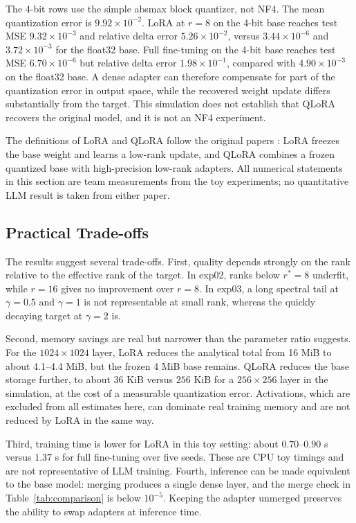 

The 4-bit rows use the simple absmax block quantizer, not NF4. The mean quantization error is $9.92\times10^{-2}$. LoRA at $r=8$ on the 4-bit base reaches test MSE $9.32\times10^{-3}$ and relative delta error $5.26\times10^{-2}$, versus $3.44\times10^{-6}$ and $3.72\times10^{-3}$ for the float32 base. Full fine-tuning on the 4-bit base reaches test MSE $6.70\times10^{-6}$ but relative delta error $1.98\times10^{-1}$, compared with $4.90\times10^{-3}$ on the float32 base. A dense adapter can therefore compensate for part of the quantization error in output space, while the recovered weight update differs substantially from the target. This simulation does not establish that QLoRA recovers the original model, and it is not an NF4 experiment.

The definitions of LoRA and QLoRA follow the original papers \cite{hu2022lora,dettmers2023qlora}: LoRA freezes the base weight and learns a low-rank update, and QLoRA combines a frozen quantized base with high-precision low-rank adapters. All numerical statements in this section are team measurements from the toy experiments; no quantitative LLM result is taken from either paper.

\subsection{Practical Trade-offs}

The results suggest several trade-offs. First, quality depends strongly on the rank relative to the effective rank of the target. In exp02, ranks below $r^{*}=8$ underfit, while $r=16$ gives no improvement over $r=8$. In exp03, a long spectral tail at $\gamma=0.5$ and $\gamma=1$ is not representable at small rank, whereas the quickly decaying target at $\gamma=2$ is.

Second, memory savings are real but narrower than the parameter ratio suggests. For the $1024\times1024$ layer, LoRA reduces the analytical total from 16 MiB to about 4.1--4.4 MiB, but the frozen 4 MiB base remains. QLoRA reduces the base storage further, to about $36$ KiB versus $256$ KiB for a $256\times256$ layer in the simulation, at the cost of a measurable quantization error. Activations, which are excluded from all estimates here, can dominate real training memory and are not reduced by LoRA in the same way.

Third, training time is lower for LoRA in this toy setting: about $0.70$--$0.90$ s versus $1.37$ s for full fine-tuning over five seeds. These are CPU toy timings and are not representative of LLM training. Fourth, inference can be made equivalent to the base model: merging produces a single dense layer, and the merge check in Table~\ref{tab:comparison} is below $10^{-5}$. Keeping the adapter unmerged preserves the ability to swap adapters at inference time.

